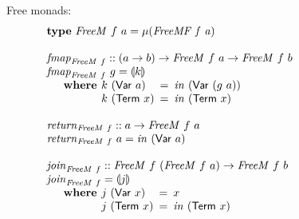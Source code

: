 \documentclass{jfp1}
\newcommand{\fold}[1]{\llparenthesis #1 \rrparenthesis}
\newcommand{\kw}[1]{\textbf{#1}}
\begin{document}
\begin{figure}
  Free monads:
  \begin{displaymath}
    \begin{array}{@{}l}
      \kw{type}~\mathit{FreeM}~f~a = \mu(\mathit{FreeMF~f~a}) \\
      \\
      \begin{array}{@{}l}
        \mathit{fmap}_{\mathit{FreeM}~f} :: (a \to b) \to \mathit{FreeM}~f~a \to \mathit{FreeM}~f~b \\
        \mathit{fmap}_{\mathit{FreeM}~f}~g = \fold{k} \\
        \quad\begin{array}{r@{\hspace{0.4em}}l@{\hspace{0.5em}}c@{\hspace{0.5em}}l}
          \kw{where} & k~(\mathsf{Var}~a) &=& \mathit{in}~(\mathsf{Var}~(g~a)) \\
          & k~(\mathsf{Term}~x) &=& \mathit{in}~(\mathsf{Term}~x)
        \end{array}
      \end{array} \\
      \\
      \begin{array}{@{}l}
        \mathit{return}_{\mathit{FreeM}~f} :: a \to \mathit{FreeM}~f~a \\
        \mathit{return}_{\mathit{FreeM}~f}~a = \mathit{in}~(\mathsf{Var}~a)
      \end{array} \\
      \\
      \begin{array}{@{}l}
        \mathit{join}_{\mathit{FreeM}~f} :: \mathit{FreeM}~f~(\mathit{FreeM}~f~a) \to \mathit{FreeM}~f~b \\
        \mathit{join}_{\mathit{FreeM}~f} = \fold{j} \\
        \quad\begin{array}{r@{\hspace{0.4em}}l@{\hspace{0.5em}}c@{\hspace{0.5em}}l}
          \kw{where} & j~(\mathsf{Var}~x) &=& x \\
          & j~(\mathsf{Term}~x) &=& \mathit{in}~(\mathsf{Term}~x)
        \end{array}
      \end{array} \\
      \\
      \begin{array}{@{}l}

\end{array}
\end{array}
\end{displaymath}
\end{figure}
\end{document}
